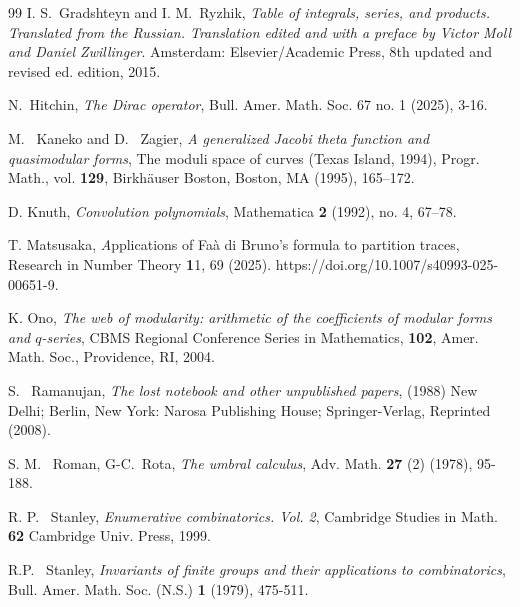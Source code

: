 \documentclass[11pt]{amsart}
\theoremstyle{definition}
\theoremstyle{remark}
\numberwithin{equation}{section}
\begin{document}
\begin{thebibliography}{99}
 I. S.~Gradshteyn and I. M.~Ryzhik, 
\emph{Table of integrals, series, and products. Translated from the Russian. Translation edited and with a preface by Victor Moll and Daniel Zwillinger}. 
Amsterdam: Elsevier/Academic Press, 8th updated and revised ed. edition, 2015.

 N.~Hitchin, 
\emph{The Dirac operator}, Bull. Amer. Math. Soc. 67 no. 1 (2025), 3-16.

 M. ~Kaneko and D. ~Zagier,
\emph{A generalized Jacobi theta function and quasimodular forms},
The moduli space of curves (Texas Island, 1994), Progr. Math., vol. \textbf{129}, Birkh\"auser Boston, Boston, MA (1995), 165--172.

 D. Knuth, \emph{Convolution polynomials}, Mathematica {\bf 2} (1992), no. 4, 67--78.

 T. Matsusaka, {\emph Applications of Faà di Bruno’s formula to partition traces},  Research in Number Theory {\textbf 11}, 69 (2025). https://doi.org/10.1007/s40993-025-00651-9.


  K. Ono,
 \emph{The web of modularity: arithmetic of the coefficients of modular forms and $q$-series}, CBMS Regional Conference Series in Mathematics, \textbf{102}, Amer. Math. Soc., Providence, RI, 2004.

 S. ~Ramanujan, 
\emph{The lost notebook and other unpublished papers}, (1988)
New Delhi; Berlin, New York: Narosa Publishing House; Springer-Verlag, Reprinted (2008).

 S. M. ~Roman, G-C.~Rota,
\emph{The umbral calculus}, Adv. Math. {\bf 27} (2) (1978), 95-188.

 R. P. ~Stanley, 
\emph{Enumerative combinatorics. Vol. 2}, Cambridge Studies in Math. {\bf 62} Cambridge Univ. Press, 1999.

  R.P. ~Stanley, 
\emph{Invariants of finite groups and their applications to combinatorics}, 
Bull. Amer. Math. Soc. (N.S.) {\bf 1} (1979), 475-511.

\end{thebibliography}
\end{document}
